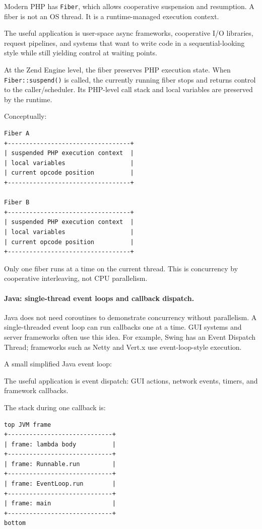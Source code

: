 Modern PHP has \texttt{Fiber}, which allows cooperative suspension and resumption. A fiber is not an OS thread. It is a runtime-managed execution context.

The useful application is user-space async frameworks, cooperative I/O libraries, request pipelines, and systems that want to write code in a sequential-looking style while still yielding control at waiting points.

At the Zend Engine level, the fiber preserves PHP execution state. When \texttt{Fiber::suspend()} is called, the currently running fiber stops and returns control to the caller/scheduler. Its PHP-level call stack and local variables are preserved by the runtime.

Conceptually:

\begin{verbatim}
Fiber A
+----------------------------------+
| suspended PHP execution context  |
| local variables                  |
| current opcode position          |
+----------------------------------+

Fiber B
+----------------------------------+
| suspended PHP execution context  |
| local variables                  |
| current opcode position          |
+----------------------------------+
\end{verbatim}

Only one fiber runs at a time on the current thread. This is concurrency by cooperative interleaving, not CPU parallelism.

\paragraph{Java: single-thread event loops and callback dispatch.}

Java does not need coroutines to demonstrate concurrency without parallelism. A single-threaded event loop can run callbacks one at a time. GUI systems and server frameworks often use this idea. For example, Swing has an Event Dispatch Thread; frameworks such as Netty and Vert.x use event-loop-style execution.

A small simplified Java event loop:

The useful application is event dispatch: GUI actions, network events, timers, and framework callbacks.

The stack during one callback is:

\begin{verbatim}
top JVM frame
+-----------------------------+
| frame: lambda body          |
+-----------------------------+
| frame: Runnable.run         |
+-----------------------------+
| frame: EventLoop.run        |
+-----------------------------+
| frame: main                 |
+-----------------------------+
bottom
\end{verbatim}

